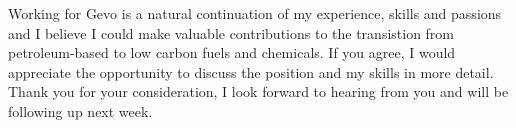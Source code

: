 \documentclass[11pt,a4paper,sans]{moderncv}
\begin{document}
\begin{spacing}{1.15}
Working for Gevo is a natural continuation of my experience, skills and passions and I believe I could make valuable contributions to the transistion from petroleum-based to low carbon fuels and chemicals. If you agree, I would appreciate the opportunity to discuss the position and my skills in more detail. Thank you for your consideration, I look forward to hearing from you and will be following up next week.

\end{spacing}
\vspace*{2mm} 
\makeletterclosing
\end{document}
